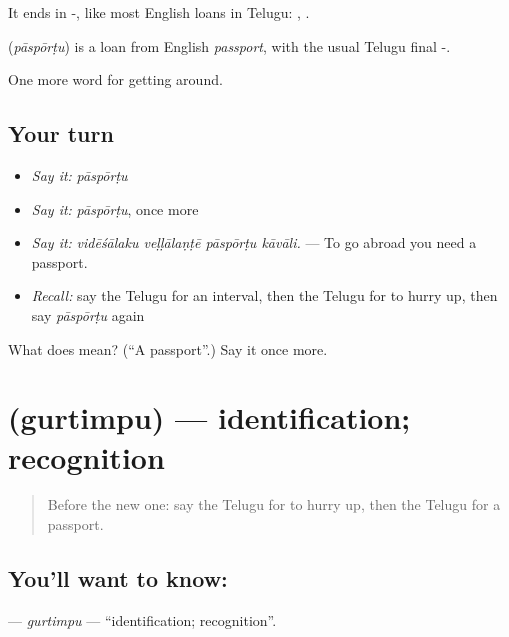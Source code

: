 It ends in -, like most English loans in Telugu: , .

\begin{cousinweb}
\textbf{} (\emph{pāspōrṭu}) is a loan from English \emph{passport}, with the usual Telugu final -.
\end{cousinweb}

\begin{grammarlens}[title={What you've built}]
One more word for getting around.
\end{grammarlens}

\subsection*{Your turn}
\begin{itemize}
\raggedright
  \item \emph{Say it:} \emph{pāspōrṭu}
  \item \emph{Say it:} \emph{pāspōrṭu}, once more
  \item \emph{Say it:} \emph{vidēśālaku veḷḷālaṇṭē pāspōrṭu kāvāli.} — To go abroad you need a passport.
  \item \emph{Recall:} say the Telugu for an interval, then the Telugu for to hurry up, then say \emph{pāspōrṭu} again
\end{itemize}

\begin{tcolorbox}[breakable,colback=teal!4,colframe=teal!35!black,title={Before you move on}]
What does  mean? (\textquotedblleft{}A passport\textquotedblright{}.) Say it once more.
\end{tcolorbox}
\section[\texorpdfstring{\te{గుర్తింపు} (gurtimpu)}{గుర్తింపు (gurtimpu)}]{ (gurtimpu) — identification; recognition}

\label{lesson:TE-C441-gurtimpu}



\begin{quote}
Before the new one: say the Telugu for to hurry up, then the Telugu for a passport.
\end{quote}

\subsection*{You'll want to know: }
\textbf{} — \emph{gurtimpu} — \textquotedblleft{}identification; recognition\textquotedblright{}.

